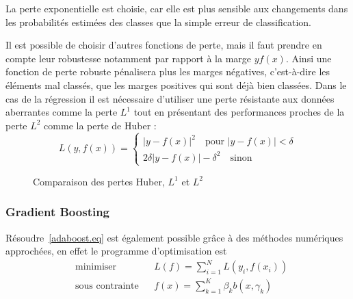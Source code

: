 La perte exponentielle est choisie, car elle est plus sensible aux changements dans les probabilités estimées des classes que la simple erreur de classification.

Il est possible de choisir d'autres fonctions de perte, mais il faut prendre en compte leur robustesse notamment par rapport à la marge $y f(x)$. Ainsi une fonction de perte robuste pénalisera plus les marges négatives, c'est-à-dire les éléments mal classés, que les marges positives qui sont déjà bien classées. Dans le cas de la régression il est nécessaire d'utiliser une perte résistante aux données aberrantes comme la perte $L^1$ tout en présentant des performances proches de la perte $L^2$ comme la perte de Huber \citet{Huber1963}:
\begin{equation*}
    L ( y , f(x) ) = \begin{cases}
        \vert y - f(x) \vert^2 \quad \text{pour } \vert y - f(x) \vert < \delta \\
        2 \delta \vert y - f(x) \vert - \delta^2 \quad \text{sinon}
    \end{cases}
\end{equation*}

\begin{figure}[htbp]
    \centering
    \caption{Comparaison des pertes Huber, $L^1$ et $L^2$}
\end{figure}

\subsubsection{Gradient Boosting}

Résoudre~\ref{adaboost.eq} est également possible grâce à des méthodes numériques approchées, en effet le programme d'optimisation est
\begin{equation}
    \begin{aligned} \label{gradient.boosting.opt}
        & \text{minimiser}
        & & L(f) = \sum_{i=1}^N  L \left(y_i, f(x_i) \right) \\
        & \text{sous contrainte}
        & & f(x) = \sum_{k=1}^K \beta_k b (x, \gamma_k) \\
    \end{aligned}
\end{equation}


